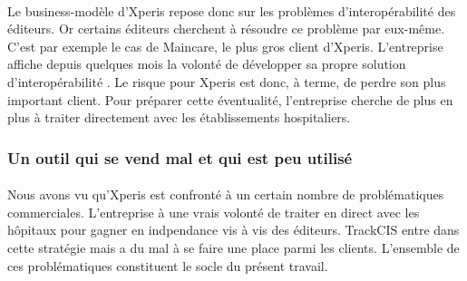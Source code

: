 			\paragraph{}%
			Le business-modèle d'Xperis repose donc sur les problèmes d'interopérabilité des 
			éditeurs. Or certains éditeurs cherchent à résoudre ce problème par eux-même. C'est 
			par exemple le cas de Maincare, le plus gros client d'Xperis. L'entreprise affiche 
			depuis quelques mois la volonté de développer sa propre solution d'interopérabilité 
			\citep{perochon_e-sante:_2016}. Le risque pour Xperis est donc, à terme, de perdre son 
			plus important client. Pour préparer cette éventualité, l'entreprise cherche de plus 
			en plus à traiter directement avec les établissements hospitaliers.
			
			\paragraph{}%
			
		\subsubsection{Un outil qui se vend mal et qui est peu utilisé}
			\paragraph{}%
			
			\paragraph{}%
			
			\paragraph{}%
			
			\paragraph{}
			Nous avons vu qu'Xperis est confronté à un certain nombre de problématiques
			commerciales. L'entreprise à une vrais volonté de traiter en direct avec les
			hôpitaux pour gagner en indpendance vis à vis des éditeurs. TrackCIS entre
			dans cette stratégie mais a du mal à se faire une place parmi les
			clients.\newline
			L'ensemble de ces problématiques constituent le socle du présent travail.
	
